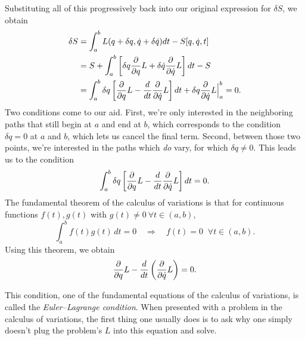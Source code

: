 \documentclass{article}
\newcommand{\md}{d}
\newcommand{\mderiv}[1]{\frac{\md}{\md {#1}}} %
\newcommand{\mvar}{t}
\begin{document}
Substituting all of this progressively back into our original expression for $\delta S$, we obtain
\begin{align*}
\delta S 
&= \int_{a}^{b} L(q + \delta q,\dot{q} + \delta \dot{q}) \md \mvar - S[q, \dot{q}, \mvar]\\
&= S + \int_{a}^{b} \left[\delta q \mpderiv{q}L + \delta \dot{q} \mpderiv{\dot{q}}L \right]\md \mvar - S\\
&= \int_{a}^{b} \delta q \left[ \mpderiv{q} L - \mderiv{\mvar}{\mpderiv{\dot{q}} L}\right] \md \mvar + \delta q \mpderiv{\dot{q}} L \Big|_{a}^{b} = 0.
\end{align*}
Two conditions come to our aid.  First, we're only interested in the neighboring paths that still begin at $a$ and end at $b$, which corresponds to the condition $\delta q = 0$ at $a$ and $b$, which lets us cancel the final term.  Second, between those two points, we're interested in the paths which \emph{do} vary, for which $\delta q \neq 0$.
This leads us to the condition
\begin{equation}
\int_{a}^{b} \delta q \left[ \mpderiv{q} L - \mderiv{\mvar}{\mpderiv{\dot{q}} L}\right] \md \mvar = 0.
\end{equation}
The fundamental theorem of the calculus of variations is that for continuous functions $f(t), g(t)$ with $g(t) \ne 0\ \forall t \in (a,b)$,
\begin{equation}
\int_{a}^{b} f(t) g(t)\,dt = 0 \quad \Longrightarrow \quad f(t) = 0 \;\; \forall t \in (a,b).
\end{equation}
Using this theorem, we obtain
\begin{equation}
\mpderiv{q} L - \mderiv{\mvar}\left(\mpderiv{\dot{q}} L\right) = 0.
\end{equation}

This condition, one of the fundamental equations of the calculus of variations, is called the \emph{Euler--Lagrange condition}.  When presented with a problem in the calculus of variations, the first thing one usually does is to ask why one simply doesn't plug the problem's $L$ into this equation and solve.
\end{document}
